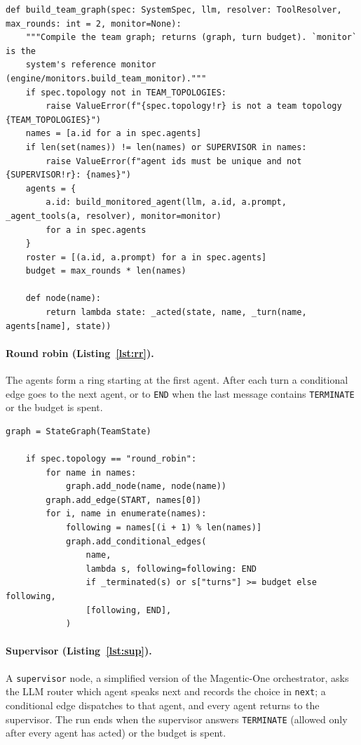 \documentclass[11pt,a4paper]{article}
\DeclareRobustCommand{\code}[1]{{\renewcommand{\_}{\textunderscore\allowbreak}\texttt{#1}}}
\begin{document}
\begin{lstlisting}[firstnumber=140,style=py,caption={Validating the spec and building the agents (\texttt{systems/graph.py}, lines 140--156)},label={lst:buildgraph}]
def build_team_graph(spec: SystemSpec, llm, resolver: ToolResolver, max_rounds: int = 2, monitor=None):
    """Compile the team graph; returns (graph, turn budget). `monitor` is the
    system's reference monitor (engine/monitors.build_team_monitor)."""
    if spec.topology not in TEAM_TOPOLOGIES:
        raise ValueError(f"{spec.topology!r} is not a team topology {TEAM_TOPOLOGIES}")
    names = [a.id for a in spec.agents]
    if len(set(names)) != len(names) or SUPERVISOR in names:
        raise ValueError(f"agent ids must be unique and not {SUPERVISOR!r}: {names}")
    agents = {
        a.id: build_monitored_agent(llm, a.id, a.prompt, _agent_tools(a, resolver), monitor=monitor)
        for a in spec.agents
    }
    roster = [(a.id, a.prompt) for a in spec.agents]
    budget = max_rounds * len(names)

    def node(name):
        return lambda state: _acted(state, name, _turn(name, agents[name], state))
\end{lstlisting}

\paragraph{Round robin (Listing~\ref{lst:rr}).} The agents form a ring starting at the
first agent. After each turn a conditional edge goes to the next agent, or to \code{END}
when the last message contains \code{TERMINATE} or the budget is spent.

\begin{lstlisting}[firstnumber=158,style=py,caption={Round-robin wiring (\texttt{systems/graph.py}, lines 158--171)},label={lst:rr}]
    graph = StateGraph(TeamState)

    if spec.topology == "round_robin":
        for name in names:
            graph.add_node(name, node(name))
        graph.add_edge(START, names[0])
        for i, name in enumerate(names):
            following = names[(i + 1) % len(names)]
            graph.add_conditional_edges(
                name,
                lambda s, following=following: END
                if _terminated(s) or s["turns"] >= budget else following,
                [following, END],
            )
\end{lstlisting}

\paragraph{Supervisor (Listing~\ref{lst:sup}).} A \code{supervisor} node, a simplified
version of the Magentic-One orchestrator, asks the LLM router which agent speaks next
and records the choice in \code{next}; a conditional edge dispatches to that agent, and
every agent returns to the supervisor. The run ends when the supervisor answers
\code{TERMINATE} (allowed only after every agent has acted) or the budget is spent.
\end{document}
